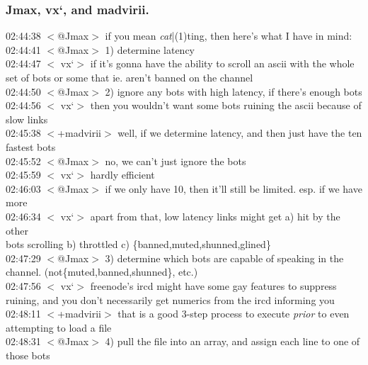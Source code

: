\documentclass{article}
\begin{document}
\subsubsection{Jmax, vx`, and madvirii.}\label{Jmax, vx`, and madvirii.}
02:44:38 $<$@Jmax$>$ if you mean \emph{cat}|(1)ting, then here's what I have in mind:\\
02:44:41 $<$@Jmax$>$ 1) determine latency\\
02:44:47 $<$ vx`$>$ if it's gonna have the ability to scroll an ascii with the whole\\\indent set of bots or some that ie. aren't banned on the channel\\
02:44:50 $<$@Jmax$>$ 2) ignore any bots with high latency, if there's enough bots\\
02:44:56 $<$ vx`$>$ then you wouldn't want some bots ruining the ascii because of\\\indent slow links\\
02:45:38 $<$+madvirii$>$ well, if we determine latency, and then just have the ten\\\indent fastest bots\\
02:45:52 $<$@Jmax$>$ no, we can't just ignore the bots\\
02:45:59 $<$ vx`$>$ hardly efficient\\
02:46:03 $<$@Jmax$>$ if we only have 10, then it'll still be limited. esp. if we have\\ more\\
02:46:34 $<$ vx`$>$ apart from that, low latency links might get a) hit by the other\\\indent bots scrolling b) throttled c) \{banned,muted,shunned,glined\}\\
02:47:29 $<$@Jmax$>$ 3) determine which bots are capable of speaking in the\\\indent channel. (not\{muted,banned,shunned\}, etc.)\\
02:47:56 $<$ vx`$>$ freenode's ircd might have some gay features to suppress\\\indent ruining, and you don't necessarily get numerics from the ircd informing you\\
02:48:11 $<$+madvirii$>$ that is a good 3-step process to execute \emph{prior} to even\\\indent attempting to load a file\\
02:48:31 $<$@Jmax$>$ 4) pull the file into an array, and assign each line to one of\\\indent those bots\\
\end{document}
